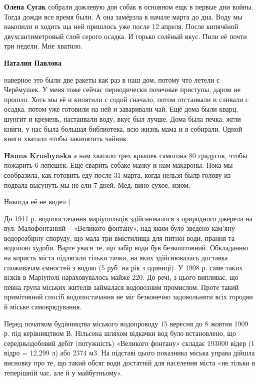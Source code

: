 \begin{itemize}
\textbf{Олена Сугак} собрали дожлевую доя собак в основном ещк в первые дни войны. Тогда дожди все время были. А она замёрзла в начале марта до дна. Воду мы накопили и ходить ща ней пришлось уже после 12 апреля. После кипячёной двухсантиметровый слой серого осадка. И горько солёный вкус. Пили её почти три недели. Мне хватило.

\textbf{Наталия Павлова} 

наверное это были две ракеты как раз в наш дом, потому что летели с Черёмушек.
У меня тоже сейчас периодически почечные приступы, даром не прошло. Хоть мы её
и кипятили с содой сначало, потом отстаивали и сливали с осадка, потом уже
готовили на ней и заваривали чай. Ещё дома были кварц, шунгит и кремень,
настаивали воду, вкус был лучше. Дома была печка, жгли книги, у нас была
большая библиотека, всю жизнь мама и я собирали. Одной книги хватало чтобы
закипятить чайник.

\textbf{Hanna Krushynska} а нам хватало трех крышек самогона 80 градусов, чтобы пожарить 6 лепешек. Ещё сварить собаке манку и нам макароны. Пока мы сообразила, как готовить еду после 31 марта, когда нельзя былр голову из подвала высунуть мы не ели 7 дней. Мед, вино сухое, изюм.

\end{itemize} %


Никогда её не видел (


До 1911 р. водопостачання маріупольців здійснювалося з природного джерела на
вул. Малофонтанній – «Великого фонтану», над яким було зведено кам’яну
водорозбірну споруду, що мала три вмістилища для питної води, прання та водопою
худоби. Варте уваги те, що забір води був безкоштовний. Обкладанню на користь
міста підлягали тільки тачки, на яких здійснювалась доставка споживачам
ємностей з водою (5 руб. на рік з одиниці). У 1908 р. саме таких візків в
Маріуполі нараховувалось майже 220. До речі, з цього випливає, що певна група
міських жителів займалася водовозним промислом. Проте такий примітивний спосіб
водопостачання не міг безконечно задовольняти всіх городян й міське
самоврядування.

Перед початком будівництва міського водопроводу 15 вересня до 8 жовтня 1909 р.
під керівництвом В. Нільсена шляхом відкачки вод було встановлено, що
середньодобовий дебіт (потужність) «Великого фонтану» складає 193000 відер (1
відро = 12,299 л) або 2374 м3. На підставі цього показника міська управа дійшла
висновку про те, що такий обсяг води достатній для населення міста «не тільки в
теперішній час, але й у майбутньому».

